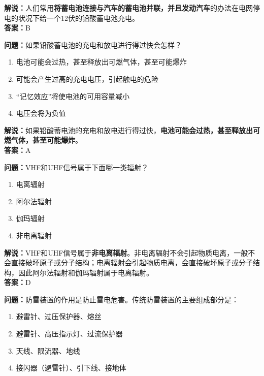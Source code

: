 \documentclass{ctexbook}
\begin{document}
\noindent\textbf{解说：}人们常用\textbf{将蓄电池连接与汽车的蓄电池并联，并且发动汽车}的办法在电网停电的状况下给一个12伏的铅酸蓄电池充电。\\\noindent\textbf{答案：}B%

\bigskip


\noindent\textbf{问题：}如果铅酸蓄电池的充电和放电进行得过快会怎样？

\begin{enumerate}[label=\Alph*), leftmargin=3em]
	\item 电池可能会过热，甚至释放出可燃气体，甚至可能爆炸
	\item 可能会产生过高的充电电压，引起触电的危险
	\item “记忆效应”将使电池的可用容量减小
	\item 电压会将为负值
\end{enumerate}

\noindent\textbf{解说：}如果铅酸蓄电池的充电和放电进行得过快，\textbf{电池可能会过热，甚至释放出可燃气体，甚至可能爆炸}。\\\noindent\textbf{答案：}A%

\bigskip


\noindent\textbf{问题：}VHF和UHF信号属于下面哪一类辐射？

\begin{enumerate}[label=\Alph*), leftmargin=3em]
	\item 电离辐射
	\item 阿尔法辐射
	\item 伽玛辐射
	\item 非电离辐射
\end{enumerate}

\noindent\textbf{解说：}VHF和UHF信号属于\textbf{非电离辐射}。非电离辐射不会引起物质电离，一般不会直接破坏原子或分子结构；电离辐射会引起物质电离，会直接破坏原子或分子结构，因此阿尔法辐射和伽玛辐射属于电离辐射。\\\noindent\textbf{答案：}D

\bigskip


\noindent\textbf{问题：}防雷装置的作用是防止雷电危害。传统防雷装置的主要组成部分是：

\begin{enumerate}[label=\Alph*), leftmargin=3em]
	\item 避雷针、过压保护器、熔丝
	\item 避雷针、高压指示灯、过流保护器
	\item 天线、限流器、地线
	\item 接闪器（避雷针）、引下线、接地体
\end{enumerate}
\end{document}
